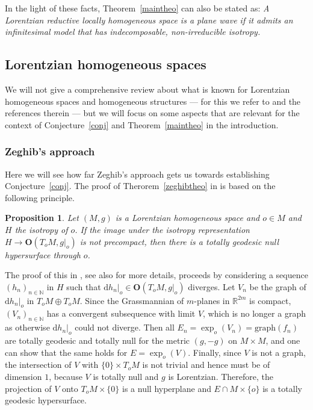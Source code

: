 \documentclass[11pt,a4paper]{amsart}
\newcommand{\+}{\oplus}
\renewcommand{\O}{\mathbf{O}}
\newcommand{\1}{\mathbf{1}}
\renewcommand{\d}{\mathrm{d}}
\newcommand{\R}{\mathbb{R}} %
\newcommand{\N}{\mathbb{N}} %
\newcommand{\<}{\langle}
\renewcommand{\>}{\rangle}
\theoremstyle{definition}
\theoremstyle{plain}
\newtheorem{proposition}[definition]{Proposition}
\numberwithin{equation}{section}
\begin{document}
In the light of these facts,  Theorem~\ref{maintheo} can also be stated as: {\em A  Lorentzian reductive locally homogeneous space is a plane wave if it admits  an  infinitesimal model that has indecomposable, non-irreducible  isotropy.}


\subsection{Lorentzian homogeneous spaces}

We will not give a comprehensive review about what is known for Lorentzian homogeneous spaces and homogeneous structures --- for this we refer to \cite{CalvarusoCastrillon-Lopez19} and the references therein --- but we will focus on some aspects that are relevant for the context of  Conjecture~\ref{conj} and Theorem~\ref{maintheo} in the introduction.

\subsubsection{Zeghib's approach}
\label{zeghibsec}
Here we will see how far Zeghib's approach gets us towards establishing  Conjecture~\ref{conj}.  The proof of Therorem~\ref{zeghibtheo}  in \cite{zeghib04} is based on the following principle.
\begin{proposition}\label{zeghibprop}
Let $(M,g)$ is a Lorentzian homogeneous space and $o\in M$ and $H$ the isotropy of $o$. If the image under the isotropy representation $H\to \O(T_oM,g|_o)$ is not precompact, then there is a totally geodesic null hypersurface through $o$.
\end{proposition}
The proof of this in \cite[Fact 6]{zeghib04}, see also \cite{steven-thesis} for more details, proceeds by considering  a sequence $(h_n)_{n\in\N}$ in $H$ such that  $\d h_n|_o\in \O(T_oM,g|_o)$ diverges. Let $V_n$ be the graph of $\d h_n |_o$ in $T_o M\oplus T_o M$. Since the Grassmannian of $m$-planes in $\R^{2m}$ is compact, $(V_n)_{n\in \N}$ has a convergent subsequence with limit $V$, which is no longer a graph as otherwise $\d h_n|_o$ could not diverge.
Then all $E_n=  \exp_o(V_n)=\mathrm{graph}(f_n)$ are totally geodesic and totally null  for the metric $(g,-g)$ on $M\times M$, and one can show that the same holds for $E= \exp_o(V)$. 
Finally, since $V$ is not a graph, the intersection of $V$ with $\{0\}\times T_oM$ is not trivial and hence must be of dimension $1$, because $V$ is totally null and $g$ is Lorentzian. Therefore, the projection of $V$ onto  $T_oM\times \{0\}$ is a null hyperplane and $E\cap M\times \{o\}$ is a  totally geodesic hypersurface.
\end{document}
